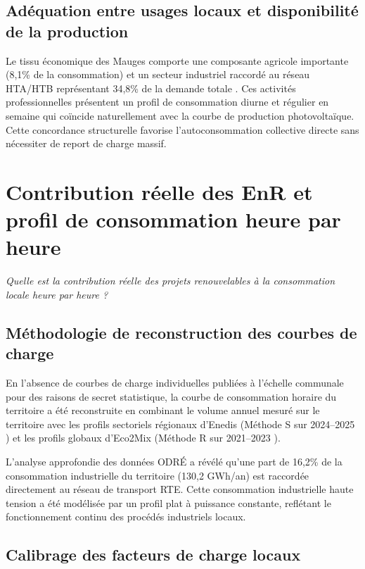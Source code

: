 \documentclass[12pt, a4paper]{report}
\begin{document}
\section{Adéquation entre usages locaux et disponibilité de la production}

Le tissu économique des Mauges comporte une composante agricole importante (8,1\% de la consommation) et un secteur industriel raccordé au réseau HTA/HTB représentant 34,8\% de la demande totale \cite{odre_conso}. Ces activités professionnelles présentent un profil de consommation diurne et régulier en semaine qui coïncide naturellement avec la courbe de production photovoltaïque. Cette concordance structurelle favorise l'autoconsommation collective directe sans nécessiter de report de charge massif.


\chapter{Contribution réelle des EnR et profil de consommation heure par heure}

\emph{Quelle est la contribution réelle des projets renouvelables à la consommation locale heure par heure ?}

\section{Méthodologie de reconstruction des courbes de charge}

En l'absence de courbes de charge individuelles publiées à l'échelle communale pour des raisons de secret statistique, la courbe de consommation horaire du territoire a été reconstruite en combinant le volume annuel mesuré sur le territoire \cite{odre_conso} avec les profils sectoriels régionaux d'Enedis (Méthode S sur 2024--2025 \cite{enedis_profils}) et les profils globaux d'Eco2Mix (Méthode R sur 2021--2023 \cite{rte_eco2mix}).

L'analyse approfondie des données ODRÉ a révélé qu'une part de 16,2\% de la consommation industrielle du territoire (130,2 GWh/an) est raccordée directement au réseau de transport RTE. Cette consommation industrielle haute tension a été modélisée par un profil plat à puissance constante, reflétant le fonctionnement continu des procédés industriels locaux.

\section{Calibrage des facteurs de charge locaux}
\end{document}

